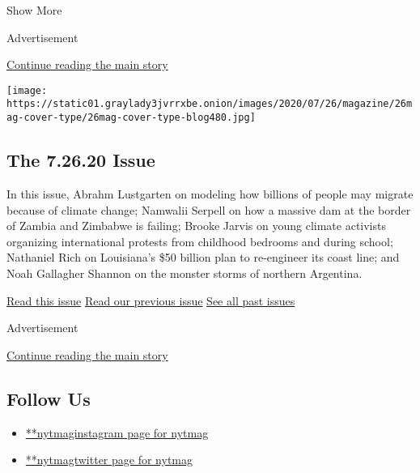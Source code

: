 Show More

Advertisement

\protect\hyperlink{after-mid2}{Continue reading the main story}

\href{https://www.nytimes3xbfgragh.onion/issue/magazine/2020/07/24/the-72620-issue}{}

\texttt{[image: https://static01.graylady3jvrrxbe.onion/images/2020/07/26/magazine/26mag-cover-type/26mag-cover-type-blog480.jpg]}

\href{https://www.nytimes3xbfgragh.onion/issue/magazine/2020/07/24/the-72620-issue}{}

\hypertarget{the-72620-issue}{%
\subsection{The 7.26.20 Issue}\label{the-72620-issue}}

In this issue, Abrahm Lustgarten on modeling how billions of people may
migrate because of climate change; Namwalii Serpell on how a massive dam
at the border of Zambia and Zimbabwe is failing; Brooke Jarvis on young
climate activists organizing international protests from childhood
bedrooms and during school; Nathaniel Rich on Louisiana's \$50 billion
plan to re-engineer its coast line; and Noah Gallagher Shannon on the
monster storms of northern Argentina.

\href{https://www.nytimes3xbfgragh.onion/issue/magazine/2020/07/24/the-72620-issue}{Read
this issue}
\href{https://www.nytimes3xbfgragh.onion/issue/magazine/2020/07/17/the-71920-issue}{Read
our previous issue}
\href{https://www.nytimes3xbfgragh.onion/interactive/2020/07/02/magazine/past-issues-sunday-magazine.html}{See
all past issues}

Advertisement

\protect\hyperlink{after-mktg}{Continue reading the main story}

\hypertarget{follow-us}{%
\subsection{Follow Us}\label{follow-us}}

\begin{itemize}
\tightlist
\item
  \href{https://instagram.com/nytmag}{**nytmaginstagram page for nytmag}
\item
  \href{https://twitter.com/nytmag}{**nytmagtwitter page for nytmag}
\end{itemize}

